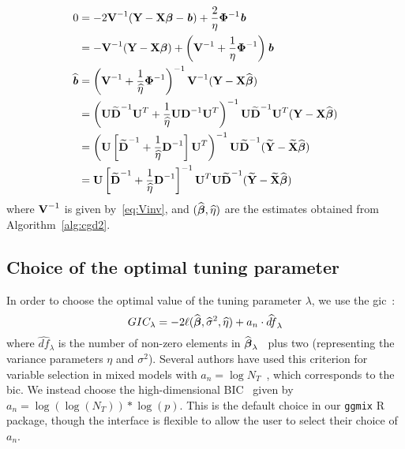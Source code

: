 \begin{align}
0 & = -2 \textbf{V}^{-1} (\textbf{Y} - \textbf{X} \boldsymbol{\beta} - \textbf{\emph{b}}) + \frac{2}{\eta} \boldsymbol{\Phi}^{-1}\textbf{\emph{b}} \nonumber \\
& = -\textbf{V}^{-1}  (\textbf{Y} - \textbf{X} \boldsymbol{\beta} ) + \left(\textbf{V}^{-1} + \frac{1}{\eta}\boldsymbol{\Phi}^{-1}\right) \textbf{\emph{b}}  \nonumber\\
\widehat{\textbf{\emph{b}}} & = \left(\textbf{V}^{-1} + \frac{1}{\widehat{\eta}}\boldsymbol{\Phi}^{-1}\right)^{-1}\textbf{V}^{-1}  (\textbf{Y} - \textbf{X} \widehat{\boldsymbol{\beta}} ) \nonumber \\
& = \left(\textbf{U} \widetilde{\textbf{D}}^{-1} \textbf{U}^T + \frac{1}{\widehat{\eta}}\textbf{U} \textbf{D}^{-1} \textbf{U}^T\right)^{-1} \textbf{U} \widetilde{\textbf{D}}^{-1} \textbf{U}^T (\textbf{Y} - \textbf{X} \widehat{\boldsymbol{\beta}} ) \nonumber \\
& = \left(\textbf{U} \left[\widetilde{\textbf{D}}^{-1} + \frac{1}{\widehat{\eta}} \textbf{D}^{-1} \right] \textbf{U}^T \right)^{-1} \textbf{U} \widetilde{\textbf{D}}^{-1} (\widetilde{\textbf{Y}} - \widetilde{\textbf{X}} \widehat{\boldsymbol{\beta}} ) \nonumber \\
& = \textbf{U} \left[\widetilde{\textbf{D}}^{-1} + \frac{1}{\widehat{\eta}} \textbf{D}^{-1} \right]^{-1} \textbf{U}^T \textbf{U} \widetilde{\textbf{D}}^{-1} (\widetilde{\textbf{Y}} - \widetilde{\textbf{X}} \widehat{\boldsymbol{\beta}} ) \nonumber
\end{align}
where $\textbf{V}^{-1}$ is given by~\eqref{eq:Vinv}, and $(\widehat{\boldsymbol{\beta}}, \widehat{\eta})$ are the estimates obtained from Algorithm~\ref{alg:cgd2}.

\subsection{Choice of the optimal tuning parameter}

In order to choose the optimal value of the tuning parameter $\lambda$, we use the \ac{gic}~\citep{nishii1984asymptotic}:
\begin{equation}
GIC_{\lambda} = -2 \ell(\widehat{\boldsymbol{\beta}}, \widehat{\sigma}^2, \widehat{\eta}) + a_n \cdot \widehat{df}_{\lambda}
\end{equation}
where $\widehat{df}_{\lambda}$ is the number of non-zero elements in $\widehat{\boldsymbol{\beta}}_{\lambda}$~\citep{zou2007degrees} plus two (representing the variance parameters $\eta$ and $\sigma^2$). Several authors have used this criterion for variable selection in mixed models with $a_n = \log N_T$~\citep{bondell2010joint,schelldorfer2011estimation}, which corresponds to the \ac{bic}. We instead choose the high-dimensional BIC~\citep{fan2013tuning} given by $a_n = \log(\log(N_T)) * \log(p)$. This is the default choice in our \texttt{ggmix} R package, though the interface is flexible to allow the user to select their choice of $a_n$. 


